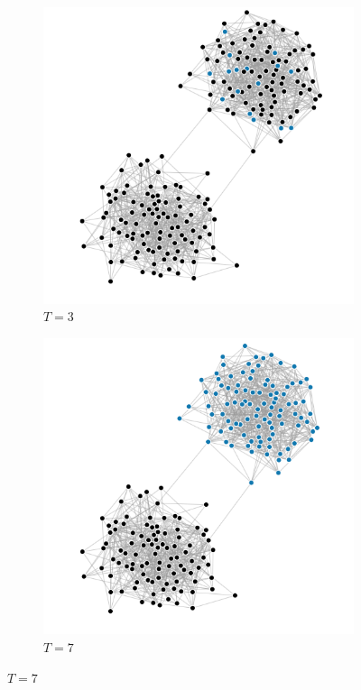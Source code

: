 \documentclass[10pt,journal,a4paper]{IEEEtran}
\begin{document}
\begin{figure}
\centering

\begin{subfigure}[b]{.5\linewidth}
\includegraphics[width=1\linewidth]{figs/split-1}
\caption{$T=3$}
\end{subfigure}%
\begin{subfigure}[b]{.5\linewidth}
\includegraphics[width=1\linewidth]{figs/split-2}
\caption{$T=7$}
\end{subfigure}


\end{figure}
\end{document}
